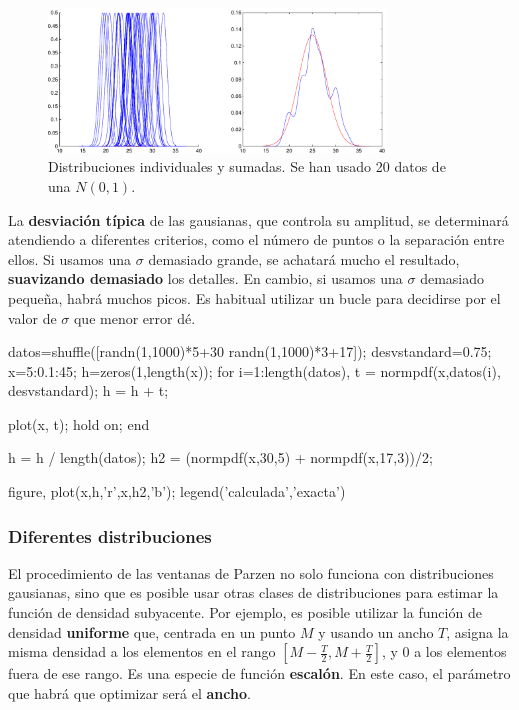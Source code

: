 \documentclass[11pt]{scrartcl}
\begin{document}
\begin{figure}[h!]
  \centering
  \includegraphics[width=0.8\textwidth]{img/parzen_1}
  \caption{Distribuciones individuales y sumadas. Se han usado 20 datos de una $N(0,1)$.}
\end{figure}

La \textbf{desviación típica} de las gausianas, que controla su amplitud, se
determinará atendiendo a diferentes criterios, como el número de puntos o la
separación entre ellos. Si usamos una $\sigma$ demasiado grande, se achatará
mucho el resultado, \textbf{suavizando demasiado} los detalles. En cambio, si
usamos una $\sigma$ demasiado pequeña, habrá muchos picos. Es habitual utilizar
un bucle para decidirse por el valor de $\sigma$ que menor error dé.

\begin{matlabcode}
datos=shuffle([randn(1,1000)*5+30 randn(1,1000)*3+17]);
desvstandard=0.75;
x=5:0.1:45;
h=zeros(1,length(x));
for i=1:length(datos),  
  t = normpdf(x,datos(i), desvstandard);
  h = h + t;  

  plot(x, t);  hold on;
end 

h = h / length(datos);
h2 = (normpdf(x,30,5) + normpdf(x,17,3))/2;

figure, plot(x,h,'r',x,h2,'b');
legend('calculada','exacta')
\end{matlabcode}

\subsubsection{Diferentes distribuciones}

El procedimiento de las ventanas de Parzen no solo funciona con distribuciones
gausianas, sino que es posible usar otras clases de distribuciones para estimar
la función de densidad subyacente. Por ejemplo, es posible utilizar la función
de densidad \textbf{uniforme} que, centrada en un punto $M$ y usando un ancho
$T$, asigna la misma densidad a los elementos en el rango $[M - \frac{T}{2}, M +
\frac{T}{2}]$, y 0 a los elementos fuera de ese rango. Es una especie de función
\textbf{escalón}. En este caso, el parámetro que habrá que optimizar será el
\textbf{ancho}.
\end{document}
